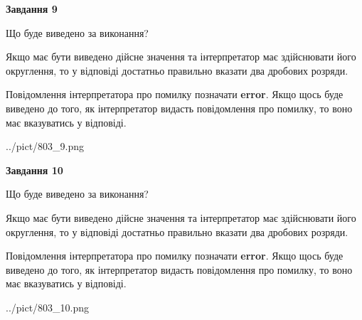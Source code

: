 \documentclass[12pt, ukrainian]{article}
\begin{document}
{\begin {Large}
{\begin {center}\textbf{Завдання 9}\end {center}}\par
Що буде виведено за виконання? \par

Якщо має бути виведено дійсне значення та інтерпретатор має здійснювати його округлення, 
то у відповіді достатньо правильно вказати два дробових розряди.

Повідомлення інтерпретатора про помилку позначати \textbf{error}.
Якщо щось буде виведено до того, як інтерпретатор видасть повідомлення про помилку, 
то воно має вказуватись у відповіді. \par

\begin{center}
	{../pict/803_9.png}
\end{center}
\newpage

{\begin {center}\textbf{Завдання 10}\end {center}}\par
Що буде виведено за виконання? \par

Якщо має бути виведено дійсне значення та інтерпретатор має здійснювати його округлення, 
то у відповіді достатньо правильно вказати два дробових розряди.

Повідомлення інтерпретатора про помилку позначати \textbf{error}.
Якщо щось буде виведено до того, як інтерпретатор видасть повідомлення про помилку, 
то воно має вказуватись у відповіді. \par

\begin{center}
	{../pict/803_10.png}
\end{center}
\newpage

\end {Large}}
\end{document}

